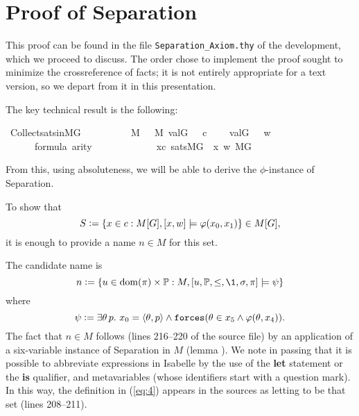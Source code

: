 \section{Proof of Separation}

This proof can be found in the file \verb|Separation_Axiom.thy| of the
development, which we proceed to discuss. The order chose to implement
the proof sought to minimize the crossreference of facts;  it is
not entirely appropriate for a text version, so we depart from it in
this presentation.

The key technical result is the following:
\begin{isabelle}
  \isamarkupfalse%
  \ Collect{\isacharunderscore}sats{\isacharunderscore}in{\isacharunderscore}MG\ {\isacharcolon}\isanewline
  \ \ \isanewline
  \ \ \ \ {\isachardoublequoteopen}{\isasympi}\ {\isasymin}\ M{\isachardoublequoteclose}\ {\isachardoublequoteopen}{\isasymsigma}\ {\isasymin}\ M{\isachardoublequoteclose}\ {\isachardoublequoteopen}val{\isacharparenleft}G{\isacharcomma}\ {\isasympi}{\isacharparenright}\ {\isacharequal}\ c{\isachardoublequoteclose}\isanewline
  \ \ \ \  {\isachardoublequoteopen}val{\isacharparenleft}G{\isacharcomma}\ {\isasymsigma}{\isacharparenright}\ {\isacharequal}\ w{\isachardoublequoteclose}\isanewline
  \ \ \ \ {\isachardoublequoteopen}{\isasymphi}\ {\isasymin}\ formula{\isachardoublequoteclose}\ {\isachardoublequoteopen}arity{\isacharparenleft}{\isasymphi}{\isacharparenright}\ {\isasymle}\ {}{\isachardoublequoteclose}\isanewline
  \ \ \ \ \ \ \isanewline
  \ \ \ \ {\isachardoublequoteopen}{\isacharbraceleft}x{\isasymin}c{\isachardot}\ sats{\isacharparenleft}M{\isacharbrackleft}G{\isacharbrackright}{\isacharcomma}\ {\isasymphi}{\isacharcomma}\ {\isacharbrackleft}x{\isacharcomma}\ w{\isacharbrackright}{\isacharparenright}{\isacharbraceright}{\isasymin}\ M{\isacharbrackleft}G{\isacharbrackright}{\isachardoublequoteclose}
\end{isabelle}
%
From this, using absoluteness, we will be able to derive the
$\phi$-instance of Separation. 

To show that   
\[
S\mathrel{\mathop:}=\{x\in c : M[G],[x,w]\models \varphi(x_0,x_1)\} \in M[G],
\]
it is enough to provide a name $n\in M$ for this set.
 
The candidate name is
\begin{equation}\label{eq:4}
n \defi \{u \in\dom(\pi)\times\PP :M,[u,\PP,\leq,\1,\sig,\pi]\models \psi\}
\end{equation}
where
\[
\psi \mathrel{\mathop:}= \exists \theta\, p.\ x_0=\langle\theta,p\rangle \wedge 
   \mathop{\mathtt{forces}}(\theta\in x_5\wedge\varphi(\theta,x_4)).
\]
The fact that $n\in M$ follows (lines 216--220 of the source file) by
an application of a six-variable instance of Separation in $M$ (lemma
). We note in
passing that it is possible to  abbreviate expressions in Isabelle by
the use of the  \textbf{let} statement or the \textbf{is} qualifier,
and metavariables (whose
identifiers start with a question mark). In this way, the definition in
(\ref{eq:4}) appears in the sources as letting  to be that
set (lines 208--211).

